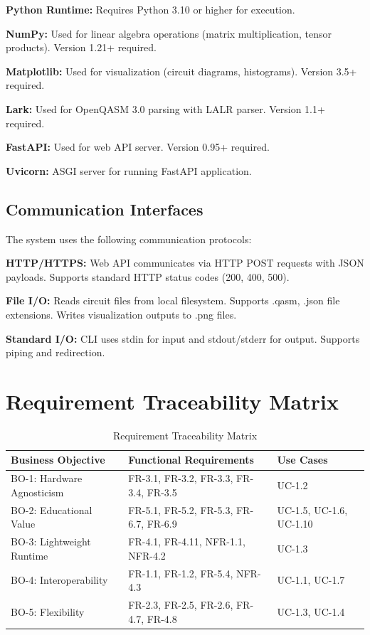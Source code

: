 \textbf{Python Runtime:} Requires Python 3.10 or higher for execution.

\textbf{NumPy:} Used for linear algebra operations (matrix multiplication, tensor products). Version 1.21+ required.

\textbf{Matplotlib:} Used for visualization (circuit diagrams, histograms). Version 3.5+ required.

\textbf{Lark:} Used for OpenQASM 3.0 parsing with LALR parser. Version 1.1+ required.

\textbf{FastAPI:} Used for web API server. Version 0.95+ required.

\textbf{Uvicorn:} ASGI server for running FastAPI application.

\subsection{Communication Interfaces}
The system uses the following communication protocols:

\textbf{HTTP/HTTPS:} Web API communicates via HTTP POST requests with JSON payloads. Supports standard HTTP status codes (200, 400, 500).

\textbf{File I/O:} Reads circuit files from local filesystem. Supports .qasm, .json file extensions. Writes visualization outputs to .png files.

\textbf{Standard I/O:} CLI uses stdin for input and stdout/stderr for output. Supports piping and redirection.

\section{Requirement Traceability Matrix}

\begin{table}[H]
\centering
\caption{Requirement Traceability Matrix}
\begin{tabular}{|p{2.5cm}|p{4cm}|p{6cm}|}
\hline
\textbf{Business Objective} & \textbf{Functional Requirements} & \textbf{Use Cases} \\
\hline
BO-1: Hardware Agnosticism & FR-3.1, FR-3.2, FR-3.3, FR-3.4, FR-3.5 & UC-1.2 \\
\hline
BO-2: Educational Value & FR-5.1, FR-5.2, FR-5.3, FR-6.7, FR-6.9 & UC-1.5, UC-1.6, UC-1.10 \\
\hline
BO-3: Lightweight Runtime & FR-4.1, FR-4.11, NFR-1.1, NFR-4.2 & UC-1.3 \\
\hline
BO-4: Interoperability & FR-1.1, FR-1.2, FR-5.4, NFR-4.3 & UC-1.1, UC-1.7 \\
\hline
BO-5: Flexibility & FR-2.3, FR-2.5, FR-2.6, FR-4.7, FR-4.8 & UC-1.3, UC-1.4 \\
\hline
\end{tabular}
\end{table}
\FloatBarrier

